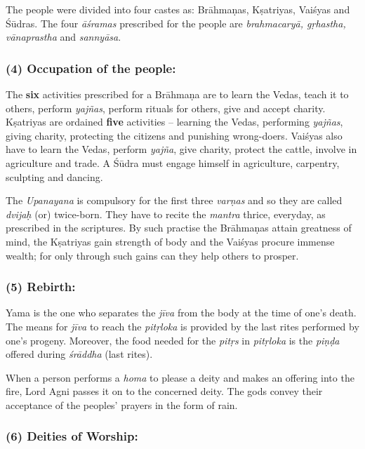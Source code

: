 The people were divided into four castes as: Brāhmaṇas, Kṣatriyas, Vaiśyas and Śūdras. The four \textit{āśramas} prescribed for the people are \textit{brahmacaryā, gṛhastha, vānaprastha} and \textit{sannyāsa}.


\subsubsection*{(4) Occupation of the people:}

\vskip -7pt

The \textbf{six} activities prescribed for a Brāhmaṇa are to learn the Vedas, teach it to others, perform \textit{yajñas}, perform rituals for others, give and accept charity. Kṣatriyas are ordained \textbf{five} activities – learning the Vedas, performing \textit{yajñas}, giving charity, protecting the citizens and punishing wrong-doers. Vaiśyas also have to learn the Vedas, perform \textit{yajña}, give charity, protect the cattle, involve in agriculture and trade. A Śūdra must engage himself in agriculture, carpentry, sculpting and dancing.

The \textit{Upanayana} is compulsory for the first three \textit{varṇas} and so they are called \textit{dvijaḥ} (or) twice-born. They have to recite the \textit{mantra} thrice, everyday, as prescribed in the scriptures. By such practise the Brāhmaṇas attain greatness of mind, the Kṣatriyas gain strength of body and the Vaiśyas procure immense wealth; for only through such gains can they help others to prosper.


\subsubsection*{(5) Rebirth:}

\vskip -7pt

Yama is the one who separates the \textit{jīva} from the body at the time of one’s death. The means for \textit{jīva} to reach the \textit{pitṛloka} is provided by the last rites performed by one’s progeny. Moreover, the food needed for the \textit{pitṛs} in \textit{pitṛloka} is the \textit{piṇḍa} offered during \textit{śrāddha} (last rites).

When a person performs a \textit{homa} to please a deity and makes an offering into the fire, Lord Agni passes it on to the concerned deity. The gods convey their acceptance of the peoples’ prayers in the form of rain.


\subsubsection*{(6) Deities of Worship:}

